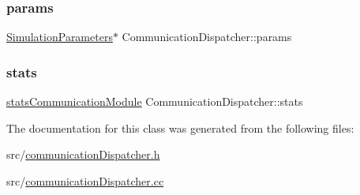\mbox{\label{classCommunicationDispatcher_a53751662d1e770a60ddbeea9d4a5d845}} 
\subsubsection{\texorpdfstring{params}{params}}
{\footnotesize\ttfamily \hyperlink{classSimulationParameters}{Simulation\+Parameters}$\ast$ Communication\+Dispatcher\+::params\hspace{0.3cm}{\ttfamily [private]}}

\mbox{\label{classCommunicationDispatcher_a5e01e95460682f3a31417efab24b25e4}} 
\subsubsection{\texorpdfstring{stats}{stats}}
{\footnotesize\ttfamily \hyperlink{communicationDispatcher_8h_a9d0242025c5ba7fecd1b0c41f4777c06}{stats\+Communication\+Module} Communication\+Dispatcher\+::stats\hspace{0.3cm}{\ttfamily [private]}}



The documentation for this class was generated from the following files\+:\begin{DoxyCompactItemize}
\item 
src/\hyperlink{communicationDispatcher_8h}{communication\+Dispatcher.\+h}\item 
src/\hyperlink{communicationDispatcher_8cc}{communication\+Dispatcher.\+cc}\end{DoxyCompactItemize}
